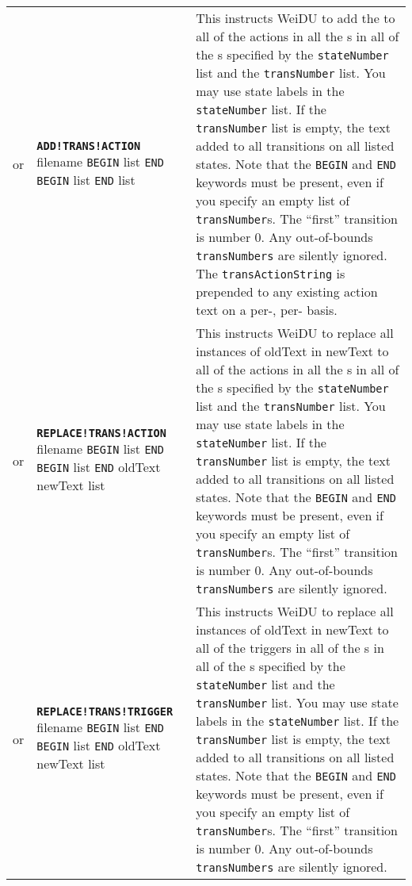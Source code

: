 \documentclass{article}
\def\ttref#1{\ahrefloc{#1}{\tt #1}}
\def\DEFINE#1{{\tt \bf #1}\label{#1}\index{#1}}
\def\t#1{{\tt #1}}
\def\Slist{{\color{red} list }}
\begin{document}
\begin{tabular}{cp{10in}|p{10in}}
  or & \DEFINE{ADD!TRANS!ACTION} filename
    \t{BEGIN} \ttref{stateNumber} \Slist \t{END}
    \t{BEGIN} \ttref{transNumber} \Slist \t{END}
    \ttref{transActionString} \ttref{dActionWhen} \Slist &
  This instructs WeiDU to add the \ttref{transActionString} to all
  of the actions in all the \ttref{transition}s in all of the \ttref{state}s specified by the
  \t{stateNumber} list and the \t{transNumber} list. You may use
  state labels in the \t{stateNumber} list. If the \t{transNumber} list
  is empty, the text added to all transitions on all listed states.
  Note that the \t{BEGIN} and \t{END} keywords must be present, even if you
  specify an empty list of \t{transNumber}s.
  The ``first'' transition is number 0. Any out-of-bounds \t{transNumbers}
  are silently ignored. The \t{transActionString} is prepended to any
  existing action text on a per-\ttref{transition}, per-\ttref{state}
  basis.

  \\

  or & \DEFINE{REPLACE!TRANS!ACTION} filename
    \t{BEGIN} \ttref{stateNumber} \Slist \t{END}
    \t{BEGIN} \ttref{transNumber} \Slist \t{END}
    oldText newText \ttref{dActionWhen} \Slist &
  This instructs WeiDU to replace all instances of oldText in newText to all
  of the actions in all the \ttref{transition}s in all of the \ttref{state}s specified by the
  \t{stateNumber} list and the \t{transNumber} list. You may use
  state labels in the \t{stateNumber} list. If the \t{transNumber} list
  is empty, the text added to all transitions on all listed states.
  Note that the \t{BEGIN} and \t{END} keywords must be present, even if you
  specify an empty list of \t{transNumber}s.
  The ``first'' transition is number 0. Any out-of-bounds \t{transNumbers}
  are silently ignored.

  \\
  or & \DEFINE{REPLACE!TRANS!TRIGGER} filename
    \t{BEGIN} \ttref{stateNumber} \Slist \t{END}
    \t{BEGIN} \ttref{transNumber} \Slist \t{END}
    oldText newText \ttref{dActionWhen} \Slist &
  This instructs WeiDU to replace all instances of oldText in newText to all
  of the triggers in all of the \ttref{transition}s in all of the \ttref{state}s specified by the
  \t{stateNumber} list and the \t{transNumber} list. You may use
  state labels in the \t{stateNumber} list. If the \t{transNumber} list
  is empty, the text added to all transitions on all listed states.
  Note that the \t{BEGIN} and \t{END} keywords must be present, even if you
  specify an empty list of \t{transNumber}s.
  The ``first'' transition is number 0. Any out-of-bounds \t{transNumbers}
  are silently ignored.


\end{tabular}
\end{document}

